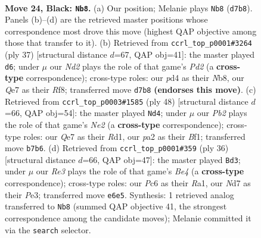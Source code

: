 \documentclass[11pt]{article}
\begin{document}
\clearpage

\begin{figure}[p]\centering
\begin{subfigure}{0.46\textwidth}\centering
\resizebox{\linewidth}{!}{%
\newchessgame
\chessboard[
  setfen={r1b5/pp1nq1k1/2p1r1p1/6pp/2BPN3/5PP1/PP2R2P/2RQ2K1 b - - 1 24},
  showmover=false,
  pgfstyle=straightmove, color=movearrow, markmove={d7-b8}
]}
\caption{}
\end{subfigure}\hfill
\begin{subfigure}{0.46\textwidth}\centering
\resizebox{\linewidth}{!}{%
\newchessgame
\chessboard[
  setfen={rn3rk1/1b1ppp1p/1p3qp1/8/1PPN1P2/4P3/1R1QB1PP/5RK1 b - - 4 19},
  showmover=false,
  pgfstyle=straightmove, color=movearrow, markmove={d7-d6}
]}
\caption{}
\end{subfigure}
\\[4pt]
\begin{subfigure}{0.46\textwidth}\centering
\resizebox{\linewidth}{!}{%
\newchessgame
\chessboard[
  setfen={1k1r3r/1p1b2p1/p3p2p/2qpP2P/2n5/2Q5/PPP1N1P1/1K1R1B1R w - - 0 25},
  showmover=false,
  pgfstyle=straightmove, color=movearrow, markmove={e2-d4}
]}
\caption{}
\end{subfigure}\hfill
\begin{subfigure}{0.46\textwidth}\centering
\resizebox{\linewidth}{!}{%
\newchessgame
\chessboard[
  setfen={r4r1k/p1q2pp1/b1n1p2p/2p5/P3B3/2P1PNP1/2Q2PP1/R4RK1 w - - 6 19},
  showmover=false,
  pgfstyle=straightmove, color=movearrow, markmove={e4-d3}
]}
\caption{}
\end{subfigure}
\caption{\textbf{Move 24, Black: \texttt{Nb8}.} (a) Our position; Melanie plays \texttt{Nb8} (\texttt{d7b8}). Panels (b)--(d) are the retrieved master positions whose correspondence most drove this move (highest QAP objective among those that transfer to it). (b) Retrieved from \texttt{ccrl\_top\_p0001\#3264} (ply 37) [structural distance $d$=67, QAP obj=41]: the master played \texttt{d6}; under $\mu$ our \emph{Nd2} plays the role of that game's \emph{Pd2} (a \textbf{cross-type} correspondence); cross-type roles: our \emph{p}d4 as their \emph{N}b8, our \emph{Q}e7 as their \emph{R}f8; transferred move \texttt{d7b8} \textbf{(endorses this move)}. (c) Retrieved from \texttt{ccrl\_top\_p0003\#1585} (ply 48) [structural distance $d$=66, QAP obj=54]: the master played \texttt{Nd4}; under $\mu$ our \emph{Pb2} plays the role of that game's \emph{Ne2} (a \textbf{cross-type} correspondence); cross-type roles: our \emph{Q}e7 as their \emph{R}d1, our \emph{p}a2 as their \emph{B}f1; transferred move \texttt{b7b6}. (d) Retrieved from \texttt{ccrl\_top\_p0001\#359} (ply 36) [structural distance $d$=66, QAP obj=47]: the master played \texttt{Bd3}; under $\mu$ our \emph{Re3} plays the role of that game's \emph{Be4} (a \textbf{cross-type} correspondence); cross-type roles: our \emph{P}c6 as their \emph{R}a1, our \emph{N}d7 as their \emph{P}e3; transferred move \texttt{e6e5}. Synthesis: 1 retrieved analog transferred to \texttt{Nb8} (summed QAP objective 41, the strongest correspondence among the candidate moves); Melanie committed it via the \texttt{search} selector.}
\label{fig:thought-m47}
\end{figure}
\end{document}
